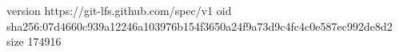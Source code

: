 version https://git-lfs.github.com/spec/v1
oid sha256:07d4660c939a12246a103976b154f3650a24f9a73d9c4fc4c0e587ec992de8d2
size 174916
